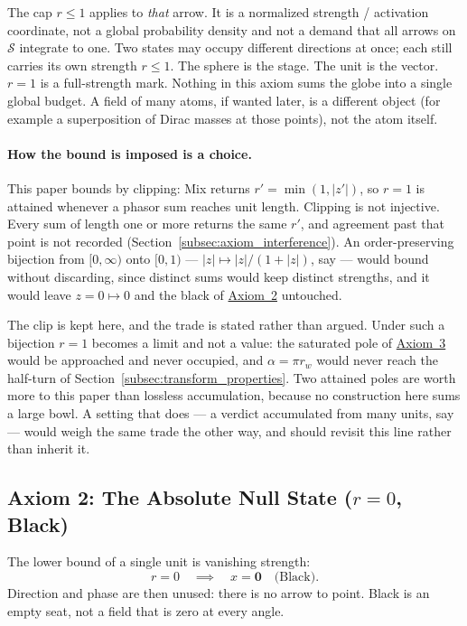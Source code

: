 \documentclass[12pt, a4paper]{article}
\begin{document}
The cap $r \le 1$ applies to \emph{that} arrow. It is a normalized strength / activation coordinate, not a global probability density and not a demand that all arrows on $\mathcal{S}$ integrate to one. Two states may occupy
different directions at once; each still carries its own strength
$r\le 1$. The sphere is the stage. The unit is the vector.
$r=1$ is a full-strength mark. Nothing in this axiom sums the globe
into a single global budget. A field of many atoms, if wanted later, is a different object (for example a superposition of Dirac masses at those points), not the atom itself.

\paragraph{How the bound is imposed is a choice.}
This paper bounds by clipping: Mix returns $r'=\min(1,|z'|)$, so
$r=1$ is attained whenever a phasor sum reaches unit length. Clipping
is not injective. Every sum of length one or more returns the same
$r'$, and agreement past that point is not recorded
(Section~\ref{subsec:axiom_interference}). An order-preserving
bijection from $[0,\infty)$ onto $[0,1)$ --- $|z|\mapsto|z|/(1+|z|)$,
say --- would bound without discarding, since distinct sums would keep
distinct strengths, and it would leave $z=0\mapsto 0$ and the black of
\hyperref[subsec:axiom_null]{Axiom~2} untouched.

The clip is kept here, and the trade is stated rather than argued.
Under such a bijection $r=1$ becomes a limit and not a value: the
saturated pole of \hyperref[subsec:axiom_white]{Axiom~3} would be approached
and never occupied, and $\alpha=\pi r_w$ would never reach the
half-turn of Section~\ref{subsec:transform_properties}. Two attained
poles are worth more to this paper than lossless accumulation, because
no construction here sums a large bowl. A setting that does --- a
verdict accumulated from many units, say --- would weigh the same
trade the other way, and should revisit this line rather than inherit
it.

\subsection{Axiom 2: The Absolute Null State ($r = 0$, Black)}
\label{subsec:axiom_null}
The lower bound of a single unit is vanishing strength:
\begin{equation}
    r = 0 \quad \implies \quad x = \mathbf{0}
    \quad \text{(Black)}.
    \label{eq:null_state}
\end{equation}
Direction and phase are then unused: there is no arrow to point.
Black is an empty seat, not a field that is zero at every angle.
\end{document}
